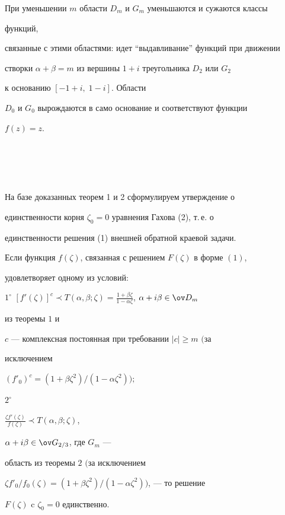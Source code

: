 \begin{note}


При уменьшении $m$ области $D_m$ и $G_m$ уменьшаются и сужаются классы


функций,


связанные с этими областями: идет ``выдавливание'' функций при движении


створки $\alpha+\beta=m$ из вершины $1+i$ треугольника $D_2$ или $G_2$


к основанию $[-1+i,\;1-i]$. Области


$D_0$ и $G_0$ вырождаются в само основание и соответствуют функции


$f(z)=z$.


\end{note}





\section{\ }





На базе доказанных теорем 1 и 2 сформулируем утверждение о


единственности корня $\zeta_0=0$ уравнения Гахова (2), т.\,е. о


единственности решения (1) внешней обратной краевой задачи.





\begin{thm}


Если функция $f(\zeta)$, связанная с решением $F(\zeta)$ в форме $(1)$,


удовлетворяет одному из условий$:$





$1^\circ$ $[f'(\zeta)]^c\prec T(\alpha,\beta;\zeta)=


\frac{1+\beta\zeta}{1-\alpha\zeta}$, $\alpha+i\beta\in\ov D_m$


из теоремы $1$ и


$c$ --- комплексная постоянная при требовании $|c|\ge m$ $($за


исключением


$(f'_0)^c=(1+\beta\zeta^2)/(1-\alpha\zeta^2));$





$2^\circ$


$\frac{\zeta f'(\zeta)}{f(\zeta)}\prec T(\alpha,\beta;\zeta)$,


$\alpha+i\beta\in\ov G_{2/3}$, где $G_m$ ---


область из теоремы $2$ $($за исключением


$\zeta f'_0/f_0(\zeta)=(1+\beta\zeta^2)/(1-\alpha\zeta^2))$, --- то решение


$F(\zeta)$ c $\zeta_0=0$ единственно.


\end{thm}





